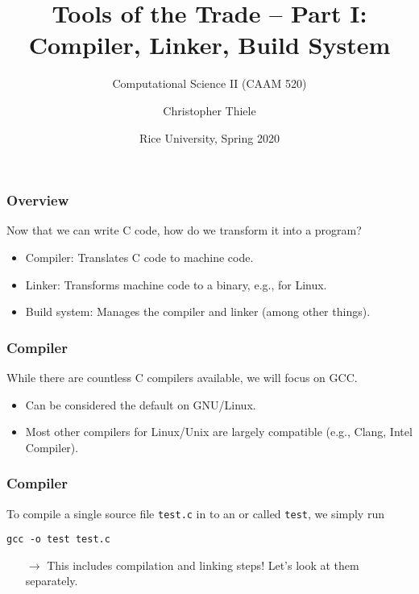 \documentclass[12pt,t]{beamer}
\let\emph\relax %
\newcommand{\conclude}[1]{%
  \begin{itemize}
    \item[$\rightarrow$]#1
  \end{itemize}
}
\newcommand{\cmd}[1]{\begin{center}\texttt{#1}\end{center}}
\begin{document}
  \title{Tools of the Trade -- Part I:\\Compiler, Linker, Build System}
  \subtitle{Computational Science II (CAAM 520)}
  \author{Christopher Thiele}
  \date{Rice University, Spring 2020}

  \begin{frame}
    \titlepage
  \end{frame}


  \begin{frame}[fragile]
    \frametitle{Overview}

    Now that we can write C code, how do we transform it into a program?
    \begin{itemize}
      \item Compiler: Translates C code to machine code.
      \item Linker: Transforms machine code to a binary, e.g., for Linux.
      \item Build system: Manages the compiler and linker (among other things).
    \end{itemize}
  \end{frame}

  \begin{frame}[fragile]
    \frametitle{Compiler}

    While there are countless C compilers available, we will focus on GCC.
    \begin{itemize}
      \item Can be considered the default on GNU/Linux.
      \item Most other compilers for Linux/Unix are largely compatible (e.g., Clang, Intel Compiler).
    \end{itemize}
  \end{frame}

  \begin{frame}[fragile]
    \frametitle{Compiler}

    To compile a single source file \texttt{test.c} in to an \emph{executable} or \emph{binary} called \texttt{test}, we simply run
    \cmd{gcc -o test test.c}

    \conclude{This includes compilation and linking steps! Let's look at them separately.}
  \end{frame}
\end{document}
